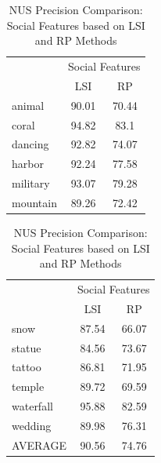 \begin{table}[!ht]
\caption{ NUS Precision Comparison: Social Features based on LSI and RP Methods} %
\centering
\begin{tabular}{|p{1.7cm}|c|c|}
 \hline
{\multirow{2}{*}{Labels}} & \multicolumn{2}{|c|}{Social Features} \\
\cline{2-3}
 & LSI & RP \\  [1ex] \hline
animal & 90.01 & 70.44 \\ [1ex] \hline
coral & 94.82 & 83.1 \\ [1ex] \hline
dancing & 92.82 & 74.07 \\ [1ex] \hline
harbor & 92.24 & 77.58 \\ [1ex] \hline
military & 93.07 & 79.28 \\ [1ex] \hline
mountain & 89.26 & 72.42 \\ [1ex] \hline
\end{tabular}
 \hspace{1em}\vspace*{0.5cm}
 \begin{tabular}{|p{1.7cm}|c|c|}
  \hline
{\multirow{2}{*}{Labels}} & \multicolumn{2}{|c|}{Social Features} \\ \cline{2-3}
 & LSI & RP \\ \hline
snow & 87.54 & 66.07 \\ [1ex] \hline
statue & 84.56 & 73.67 \\ [1ex] \hline
tattoo & 86.81 & 71.95 \\ [1ex] \hline
temple & 89.72 & 69.59 \\ [1ex] \hline
waterfall & 95.88 & 82.59 \\ [1ex] \hline
wedding & 89.98 & 76.31 \\ [1ex] \hline
AVERAGE & 90.56 & 74.76 \\ [1ex] \hline
\end{tabular}
 \label{NUSPrecisionSocialFeatures} %
\end{table}


